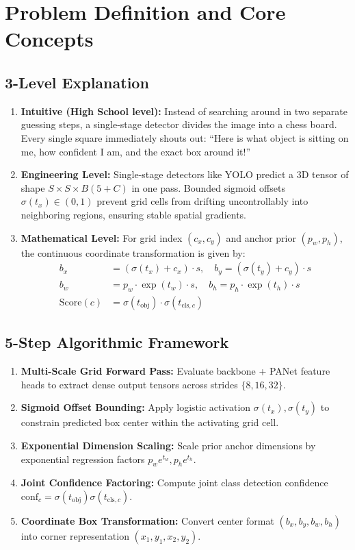 \documentclass[11pt,a4paper]{article}
\theoremstyle{definition}
\begin{document}
\section{Problem Definition and Core Concepts}

\subsection{3-Level Explanation}
\begin{enumerate}
    \item \textbf{Intuitive (High School level):} Instead of searching around in two separate guessing steps, a single-stage detector divides the image into a chess board. Every single square immediately shouts out: ``Here is what object is sitting on me, how confident I am, and the exact box around it!''
    \item \textbf{Engineering Level:} Single-stage detectors like YOLO predict a 3D tensor of shape $S \times S \times B(5 + C)$ in one pass. Bounded sigmoid offsets $\sigma(t_x) \in (0, 1)$ prevent grid cells from drifting uncontrollably into neighboring regions, ensuring stable spatial gradients.
    \item \textbf{Mathematical Level:} For grid index $(c_x, c_y)$ and anchor prior $(p_w, p_h)$, the continuous coordinate transformation is given by:
    \begin{align}
    b_x &= (\sigma(t_x) + c_x) \cdot s, \quad b_y = (\sigma(t_y) + c_y) \cdot s \\
    b_w &= p_w \cdot \exp(t_w) \cdot s, \quad b_h = p_h \cdot \exp(t_h) \cdot s \\
    \text{Score}(c) &= \sigma(t_{\text{obj}}) \cdot \sigma(t_{\text{cls}, c})
    \end{align}
\end{enumerate}

\subsection{5-Step Algorithmic Framework}
\begin{enumerate}
    \item \textbf{Multi-Scale Grid Forward Pass:} Evaluate backbone + PANet feature heads to extract dense output tensors across strides $\{8, 16, 32\}$.
    \item \textbf{Sigmoid Offset Bounding:} Apply logistic activation $\sigma(t_x), \sigma(t_y)$ to constrain predicted box center within the activating grid cell.
    \item \textbf{Exponential Dimension Scaling:} Scale prior anchor dimensions by exponential regression factors $p_w e^{t_w}, p_h e^{t_h}$.
    \item \textbf{Joint Confidence Factoring:} Compute joint class detection confidence $\text{conf}_c = \sigma(t_{\text{obj}}) \sigma(t_{\text{cls}, c})$.
    \item \textbf{Coordinate Box Transformation:} Convert center format $(b_x, b_y, b_w, b_h)$ into corner representation $(x_1, y_1, x_2, y_2)$.
\end{enumerate}
\end{document}
